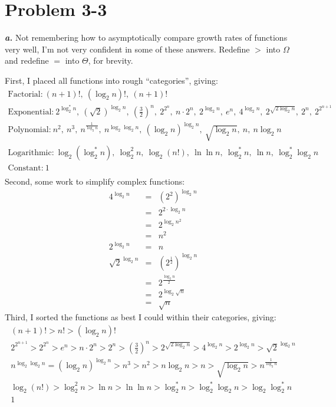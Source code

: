 \documentclass{article}
\begin{document}
\section*{Problem 3-3}

\noindent\textbf{\textit{a.}} Not remembering how to asymptotically compare growth rates of functions very well, I'm not very confident in some of these answers. Redefine $>$ into $\Omega$ and redefine $=$ into $\Theta$, for brevity.

First, I placed all functions into rough ``categories'', giving:
\begin{multline}
	\text{Factorial:} ~ (n+1)! ,~ (\log_2 n)! ,~ (n+1)! \\
	\text{Exponential:} ~ 2^{\log_2^* n} ,~ (\sqrt{2})^{\log_2 n} ,~ \left(\frac{3}{2}\right)^n ,~ 2^{2^n} ,~ n \cdot 2^n ,~ 2^{\log_2 n} ,~ e^n ,~ 4^{\log_2 n} ,~ 2^{\sqrt{2 \log_2 n}} ,~ 2^n ,~ 2^{2^{n+1}} \\
	\text{Polynomial:} ~ n^2 ,~ n^3 ,~ n^{\frac{1}{\log_2 n}} ,~ n^{\log_2 \log_2 n} ,~ \left(\log_2 n\right)^{\log_2 n} ,~ \sqrt{\log_2 n} ,~ n ,~ n \log_2 n \\
	\text{Logarithmic:} ~ \log_2 \left(\log^*_2 n\right) ,~ \log^2_2 n ,~ \log_2 (n!) ,~ \ln \ln n ,~ \log^*_2 n ,~ \ln n ,~ \log^*_2 \log_2 n \\
	\text{Constant:} ~ 1 \\
\end{multline}
Second, some work to simplify complex functions:
\begin{eqnarray*}
	4^{\log_2 n} & = & (2^2)^{\log_2 n} \\
	& = & 2^{2 \cdot \log_2 n} \\
	& = & 2^{\log_2 n^2} \\
	& = & n^2 \\
	2^{\log_2 n} & = & n \\
	\sqrt{2}^{\log_2 n} & = & \left(2^{\frac{1}{2}}\right)^{\log_2 n} \\
	& = & 2^{\frac{\log_2 n}{2}} \\
	& = & 2^{\log_2 \sqrt{n}} \\
	& = & \sqrt{n}
\end{eqnarray*}
Third, I sorted the functions as best I could within their categories, giving:
\begin{multline}
	(n+1)! > n! > (\log_2 n)! \\
	2^{2^{n+1}} > 2^{2^n} > e^n > n \cdot 2^n > 2^n > \left(\frac{3}{2}\right)^n > 2^{\sqrt{2 \log_2 n}} > 4^{\log_2 n} > 2^{\log_2 n} > \sqrt{2}^{\log_2 n} \\
	n^{\log_2 \log_2 n} = (\log_2 n)^{\log_2 n} > n^3 > n^2 > n \log_2 n > n > \sqrt{\log_2 n} > n^{\frac{1}{\log_2 n}} \\
	\log_2 (n!) > \log^2_2 n > \ln n > \ln \ln n > \log^*_2 n > \log^*_2 \log_2 n > \log_2 \log^*_2 n \\
	1 \\
\end{multline}
\end{document}
